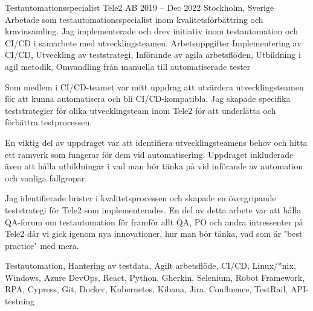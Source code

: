 \documentclass{sobCV}[2015/09/08]
\begin{document}
\experiencenode
   {Testautomationsspecialist}
   {Tele2 AB}
   {2019 -- Dec 2022}
   {Stockholm, Sverige}{
       Arbetade som testautomationsspecialist inom kvalitetsförbättring och kravinsamling. Jag implementerade och drev initiativ inom testautomation och CI/CD i samarbete med utvecklingsteamen.
   }
   {Arbetsuppgifter}{
      Implementering av CI/CD,
      Utveckling av teststrategi, 
      Införande av agila arbetsflöden,
      Utbildning i agil metodik,
      Omvandling från manuella till automatiserade tester
   }{
        {
           Som medlem i CI/CD-teamet var mitt uppdrag att utvärdera utvecklingsteamen för att kunna automatisera och bli CI/CD-kompatibla. Jag skapade specifika teststrategier för olika utvecklingsteam inom Tele2 för att underlätta och förbättra testprocessen.
       }

        {
           En viktig del av uppdraget var att identifiera utvecklingsteamens behov och hitta ett ramverk som fungerar för dem vid automatisering. Uppdraget inkluderade även att hålla utbildningar i vad man bör tänka på vid införande av automation och vanliga fallgropar.
       }

        {
           Jag identifierade brister i kvalitetsprocessen och skapade en övergripande teststrategi för Tele2 som implementerades. En del av detta arbete var att hålla QA-forum om testautomation för framför allt QA, PO och andra intressenter på Tele2 där vi gick igenom nya innovationer, hur man bör tänka, vad som är "best practice" med mera.
       }
   }{
       Testautomation,
       Hantering av testdata,
       Agilt arbetsflöde, 
       CI/CD, 
       Linux/*nix, 
       Windows, 
       Azure DevOps, 
       React, 
       Python, 
       Gherkin, 
       Selenium, 
       Robot Framework,
       RPA,
       Cypress, 
       Git, 
       Docker, 
       Kubernetes, 
       Kibana, 
       Jira, 
       Confluence, 
       TestRail, 
       API-testning 
   }

   
   
\end{document}

